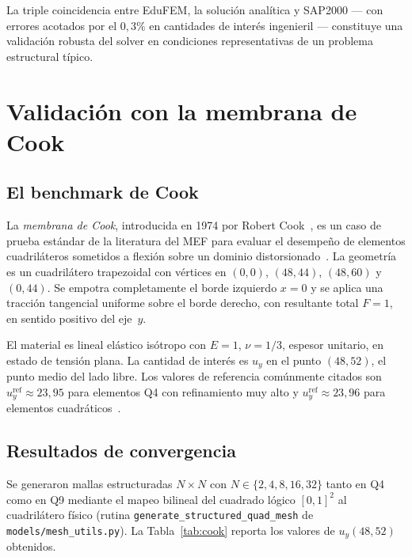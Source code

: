 La triple coincidencia entre EduFEM, la solución analítica y SAP2000 — con
errores acotados por el $0{,}3\%$ en cantidades de interés
ingenieril — constituye una validación robusta del solver en condiciones
representativas de un problema estructural típico.

\section{Validación con la membrana de Cook}

\subsection{El benchmark de Cook}

La \emph{membrana de Cook}, introducida en 1974 por Robert
Cook~\cite{cook1974improved}, es un caso de prueba estándar de la
literatura del MEF para evaluar el desempeño de elementos cuadriláteros
sometidos a flexión sobre un dominio
distorsionado~\cite{cook2001concepts,bathe2014finite}. La geometría es un
cuadrilátero trapezoidal con vértices en $(0,0)$, $(48, 44)$, $(48, 60)$ y
$(0, 44)$. Se empotra completamente el borde izquierdo $x=0$ y se aplica
una tracción tangencial uniforme sobre el borde derecho, con resultante
total $F = 1$, en sentido positivo del eje~$y$.

El material es lineal elástico isótropo con $E = 1$, $\nu = 1/3$,
espesor unitario, en estado de tensión plana. La cantidad de interés es
$u_y$ en el punto $(48, 52)$, el punto medio del lado libre. Los valores
de referencia comúnmente citados son
$u_y^{\mathrm{ref}} \approx 23{,}95$ para elementos Q4 con
refinamiento muy alto y $u_y^{\mathrm{ref}} \approx 23{,}96$ para
elementos cuadráticos~\cite{cook2001concepts}.

\subsection{Resultados de convergencia}

Se generaron mallas estructuradas $N \times N$ con $N \in \{2, 4, 8, 16, 32\}$
tanto en Q4 como en Q9 mediante el mapeo bilineal del cuadrado lógico
$[0,1]^2$ al cuadrilátero físico (rutina
\verb|generate_structured_quad_mesh| de \verb|models/mesh_utils.py|). La
Tabla~\ref{tab:cook} reporta los valores de $u_y(48, 52)$ obtenidos.

